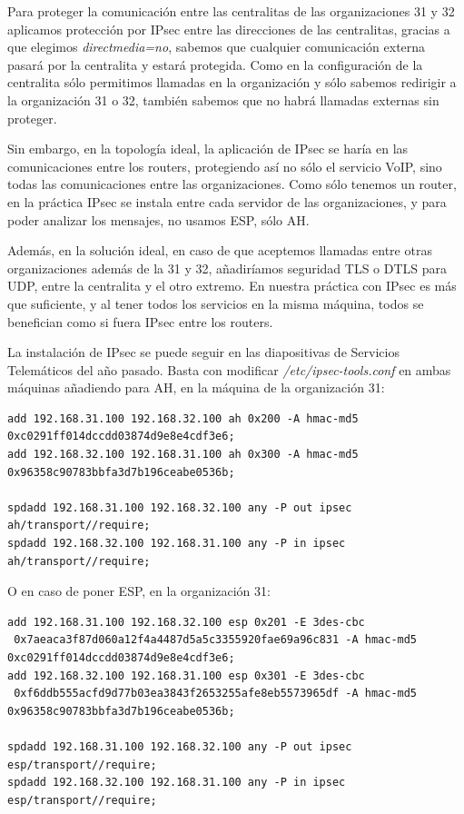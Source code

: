 \documentclass[]{article}
\begin{document}
Para proteger la comunicación entre las centralitas de las organizaciones 31 y 32 aplicamos protección por IPsec entre las direcciones de las centralitas, gracias a que elegimos \textit{directmedia=no}, sabemos que cualquier comunicación externa pasará por la centralita y estará protegida. Como en la configuración de la centralita sólo permitimos llamadas en la organización y sólo sabemos redirigir a la organización 31 o 32, también sabemos que no habrá llamadas externas sin proteger.

Sin embargo, en la topología ideal, la aplicación de IPsec se haría en las comunicaciones entre los routers, protegiendo así no sólo el servicio VoIP, sino todas las comunicaciones entre las organizaciones. Como sólo tenemos un router, en la práctica IPsec se instala entre cada servidor de las organizaciones, y para poder analizar los mensajes, no usamos ESP, sólo AH.

Además, en la solución ideal, en caso de que aceptemos llamadas entre otras organizaciones además de la 31 y 32, añadiríamos seguridad TLS o DTLS para UDP, entre la centralita y el otro extremo. En nuestra práctica con IPsec es más que suficiente, y al tener todos los servicios en la misma máquina, todos se benefician como si fuera IPsec entre los routers.

\hfill

La instalación de IPsec se puede seguir en las diapositivas de Servicios Telemáticos del año pasado. Basta con modificar \textit{/etc/ipsec-tools.conf} en ambas máquinas añadiendo para AH, en la máquina de la organización 31:

\begin{Verbatim}[frame=single]
add 192.168.31.100 192.168.32.100 ah 0x200 -A hmac-md5 0xc0291ff014dccdd03874d9e8e4cdf3e6;
add 192.168.32.100 192.168.31.100 ah 0x300 -A hmac-md5 0x96358c90783bbfa3d7b196ceabe0536b;

spdadd 192.168.31.100 192.168.32.100 any -P out ipsec ah/transport//require;
spdadd 192.168.32.100 192.168.31.100 any -P in ipsec ah/transport//require;
\end{Verbatim}


O en caso de poner ESP, en la organización 31:

\begin{Verbatim}[frame=single]
add 192.168.31.100 192.168.32.100 esp 0x201 -E 3des-cbc
 0x7aeaca3f87d060a12f4a4487d5a5c3355920fae69a96c831 -A hmac-md5 0xc0291ff014dccdd03874d9e8e4cdf3e6;
add 192.168.32.100 192.168.31.100 esp 0x301 -E 3des-cbc
 0xf6ddb555acfd9d77b03ea3843f2653255afe8eb5573965df -A hmac-md5 0x96358c90783bbfa3d7b196ceabe0536b;

spdadd 192.168.31.100 192.168.32.100 any -P out ipsec esp/transport//require;
spdadd 192.168.32.100 192.168.31.100 any -P in ipsec esp/transport//require;
\end{Verbatim}
\end{document}
